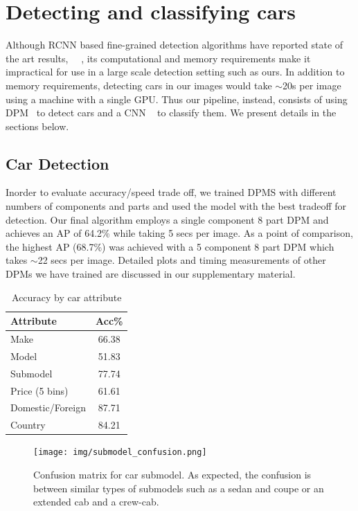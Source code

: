 \documentclass[10pt,twocolumn,letterpaper]{article}
\begin{document}
\section{Detecting and classifying cars}
\label{sec:detection}
Although RCNN based fine-grained detection algorithms have reported state of the art results, ~\cite{rcnn}~\cite{ning}, its computational and memory requirements make it impractical for use in a large scale detection setting such as ours. In addition to memory requirements, detecting cars in our images would take \(\sim\)20s per image using a machine with a single GPU. Thus our pipeline, instead, consists of using DPM~\cite{dpm} to detect cars and a CNN ~\cite{alexnet} to classify them. We present details in the sections below.

\subsection{Car Detection}
Inorder to evaluate accuracy/speed trade off, we trained DPMS with different numbers of components and parts and used the model with the best tradeoff for detection. Our final algorithm employs a single component 8 part DPM and achieves an AP of 64.2\% while taking 5 secs per image. As a point of comparison, the highest AP (68.7\%) was achieved with a 5 component 8 part DPM which takes \(\sim\)22 secs per image. Detailed plots and timing measurements of other DPMs we have trained are discussed in our supplementary material.


\begin{table}
\begin{center}
\begin{tabular}{|l|c|}
\hline
\textbf{Attribute} & \textbf{Acc\%} \\
\hline\hline
Make & 66.38 \\
Model & 51.83 \\
Submodel & 77.74 \\
Price (5 bins)& 61.61 \\
Domestic/Foreign & 87.71\\
Country & 84.21\\
\hline
\end{tabular}
\end{center}
\caption{Accuracy by car attribute}
\label{table:att-acc}
\end{table}

\begin{figure}[t]
\begin{center}
   \texttt{[image: img/submodel\_confusion.png]}
\end{center}
   \caption{Confusion matrix for car submodel. As expected, the confusion is between similar types of submodels such as a sedan and coupe or an extended cab and a crew-cab.} 
\label{fig:confusion}
\end{figure}
\end{document}
